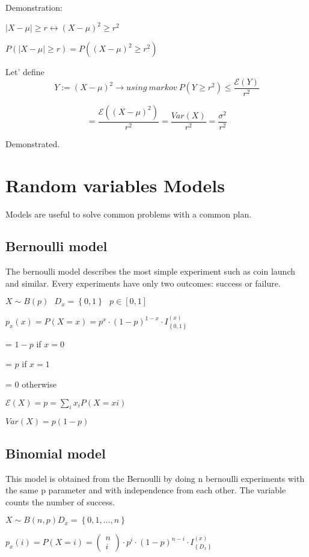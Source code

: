 \documentclass{article}
\begin{document}
Demonstration:

$|X - \mu| \geq r \leftrightarrow (X - \mu)^2 \geq r^2$
\bigskip

$P(|X - \mu| \geq r) = P((X - \mu)^2 \geq r^2)$

Let' define $$Y:= (X - \mu)^2 \rightarrow using \ markov \ P(Y \geq r^2) \leq \frac{\mathcal E(Y)}{r^2}$$

$$= \frac{\mathcal E((X- \mu)^2)}{r^2} = \frac{Var(X)}{r^2} = \frac{\sigma^2}{r^2}$$

Demonstrated.

\section{Random variables Models}

Models are useful to solve common problems with a common plan.

\subsection{Bernoulli model}

The bernoulli model describes the most simple experiment such as coin launch and similar. Every experiments have only two outcomes: success or failure.
\bigskip

$X \sim B(p) \ \ \ D_x = \left\{0,1\right\} \ \ \ p \in [0,1]$
\bigskip

$p_x(x) = P(X=x) = p^x \cdot(1-p)^{1-x} \cdot I_\left\{0,1\right\}^{(x)}$

= $1-p$ if $x = 0$ 

= $p$ if $x = 1$

= 0 otherwise
\bigskip

$\mathcal E(X) = p = \sum_{i}x_i P(X=xi)$

$Var(X)=p(1-p)$

\subsection{Binomial model}

This model is obtained from the Bernoulli by doing n bernoulli experiments with the same p parameter and with independence from each other. The variable counts the number of success.

$X \sim B(n,p) D_x = \left\{0,1,...,n\right\}$
\bigskip

$p_x(i) = P(X=i) = \left(\begin{array}{c} n \\ i \end{array} \right) \cdot p^i \cdot (1-p)^{n-i}\cdot I_\left\{D_x\right\}^{(x)}$
\bigskip
\end{document}
